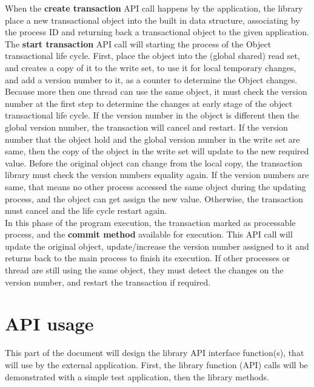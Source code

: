 \documentclass[12pt]{article}
\begin{document}
When the \textbf{create transaction} API call happens by the application, the library place a new transactional object into the built in data structure, associating by the process ID and returning back a transactional object to the given application.\\

The \textbf{start transaction} API call will starting the process of the Object transactional life cycle. First, place the object into the (global shared) read set, and creates a copy of it to the write set, to use it for local temporary changes, and add a version number to it, as a counter to determine the Object changes. Because more then one thread can use the same object, it must check the version number at the first step to determine the changes at early stage of the object transactional life cycle. If the version number in the object is different then the global version number, the transaction will cancel and restart. If the version number that the object hold and the global version number in the write set are same, then the copy of the object in the write set will update to the new required value. Before the original object can change from the local copy, the transaction library must check the version numbers equality again. If the version numbers are same, that means no other process accessed the same object during the updating process, and the object can get assign the new value. Otherwise, the transaction must cancel and the life cycle restart again.\\

In this phase of the program execution, the transaction marked as processable process, and the \textbf{commit method} available for execution. This API call will update the original object, update/increase the version number assigned to it and returns back to the main process to finish its execution. If other processes or thread are still using the same object, they must detect the changes on the version number, and restart the transaction if required.

\newpage
\section{API usage}
This part of the document will design the library API interface function(s), that will use by the external application. First, the library function (API) calls will be demonstrated with a simple test application, then the library methods.\\
\end{document}
